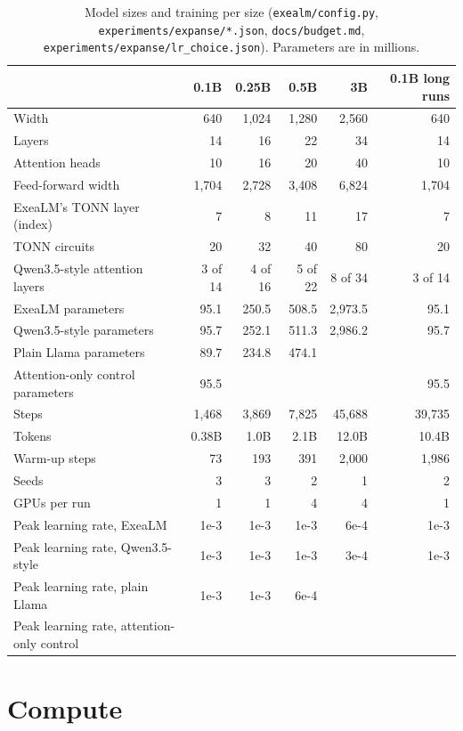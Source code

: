 \documentclass[10pt,twocolumn,letterpaper]{article}
\newcommand{\pend}[1]{\fcolorbox{pendline}{pendfill}{\footnotesize\bfseries PENDING: #1}}
\begin{document}
\begin{table}[h]
\centering\small
\caption{Model sizes and training per size (\texttt{exealm/config.py}, \texttt{experiments/expanse/*.json}, \texttt{docs/budget.md}, \texttt{experiments/expanse/lr\_choice.json}). Parameters are in millions.}
\label{tab:hyper}
\begin{tabular}{@{}l r r r r r@{}}
\toprule
& 0.1B & 0.25B & 0.5B & 3B & 0.1B long runs \\
\midrule
Width & 640 & 1,024 & 1,280 & 2,560 & 640 \\
Layers & 14 & 16 & 22 & 34 & 14 \\
Attention heads & 10 & 16 & 20 & 40 & 10 \\
Feed-forward width & 1,704 & 2,728 & 3,408 & 6,824 & 1,704 \\
ExeaLM's TONN layer (index) & 7 & 8 & 11 & 17 & 7 \\
TONN circuits & 20 & 32 & 40 & 80 & 20 \\
Qwen3.5-style attention layers & 3 of 14 & 4 of 16 & 5 of 22 & 8 of 34 & 3 of 14 \\
\midrule
ExeaLM parameters & 95.1 & 250.5 & 508.5 & 2,973.5 & 95.1 \\
Qwen3.5-style parameters & 95.7 & 252.1 & 511.3 & 2,986.2 & 95.7 \\
Plain Llama parameters & 89.7 & 234.8 & 474.1 & & \\
Attention-only control parameters & 95.5 & & & & 95.5 \\
\midrule
Steps & 1,468 & 3,869 & 7,825 & 45,688 & 39,735 \\
Tokens & 0.38B & 1.0B & 2.1B & 12.0B & 10.4B \\
Warm-up steps & 73 & 193 & 391 & 2,000 & 1,986 \\
Seeds & 3 & 3 & 2 & 1 & 2 \\
GPUs per run & 1 & 1 & 4 & 4 & 1 \\
\midrule
Peak learning rate, ExeaLM & 1e-3 & 1e-3 & 1e-3 & 6e-4 & 1e-3 \\
Peak learning rate, Qwen3.5-style & 1e-3 & 1e-3 & 1e-3 & 3e-4 & 1e-3 \\
Peak learning rate, plain Llama & 1e-3 & 1e-3 & 6e-4 & & \\
Peak learning rate, attention-only control & \multicolumn{5}{l}{\pend{confirm from the control runs' logs}} \\
\bottomrule
\end{tabular}
\end{table}

\section{Compute}
\label{app:compute}
\end{document}
